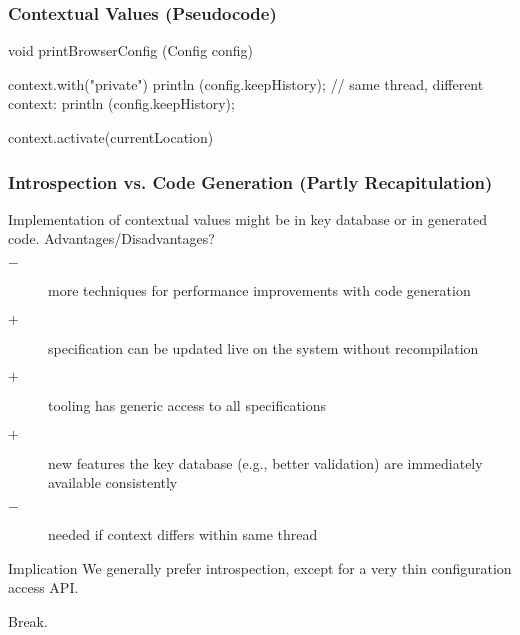 \begin{frame}[fragile]
	\frametitle{Contextual Values (Pseudocode)}

	\begin{code}[gobble=4,language=C++,morekeywords={context}]
	void printBrowserConfig (Config config)
	{
		context.with("private")
		{
			println (config.keepHistory);
		}
		// same thread, different context:
		println (config.keepHistory);

		context.activate(currentLocation)
	}
	\end{code}
\end{frame}
\begin{frame}
	\frametitle{Introspection vs. Code Generation (Partly Recapitulation)}

	Implementation of contextual values might be in key database or in generated code.
	Advantages/Disadvantages?

	\pause

	\begin{description} %
	\item[$-$] more techniques for performance improvements with code generation
	\item[$+$] specification can be updated live on the system without recompilation
	\item[$+$] tooling has generic access to all specifications
 	\item[$+$] new features the key database (e.g., better validation) are immediately available consistently
	\item[$-$] \color{red} needed if context differs within same thread
	\end{description}

	\vspace{0.5em}

	\begin{alertblock}{Implication}
	We generally prefer introspection, except for a very thin configuration access API.
	\end{alertblock}
\end{frame}


\begin{assignment}
	\begin{task}
	Break.
	\end{task}
\end{assignment}

